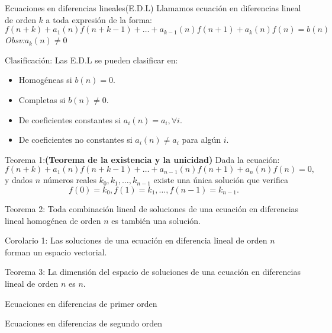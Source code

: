 \documentclass[spanish, utf8,handout]{beamer} %
\theoremstyle{definition}
\begin{document}
\begin{frame}
	 \begin{block}{Ecuaciones en diferencias lineales(E.D.L)}
	 Llamamos ecuación en diferencias lineal de orden $ k $ a toda expresión de la forma:
	 $$
	 f(n+k)+a_{1}(n)f(n+k-1)+\ldots+a_{k-1}(n)f(n+1)+a_{k}(n)f(n)=b(n)
	 $$
	 \emph{Obsv:}\hspace{2mm}$ a_{k}(n)\neq0$
	 \end{block}
 \begin{block}{Clasificación:}
 	Las E.D.L se pueden clasificar en:\\
 	\begin{itemize}
 		\item Homogéneas si $ b(n)=0 .$
 		\item Completas si $ b(n)\neq0.$
 		\item De coeficientes constantes si $ a_{i}(n)=a_{i}, \forall i .$
 		\item De coeficientes no constantes si $ a_{i}(n)\neq a_{i} $ para algún $ i .$
 	\end{itemize}
 \end{block}
\end{frame}
\begin{frame}
	\begin{block}{Teorema 1:{\bf (Teorema de la existencia y la unicidad)}}
		Dada la ecuación:
		$$
		f(n+k)+a_{1}(n)f(n+k-1)+\ldots+a_{n-1}(n)f(n+1)+a_{n}(n)f(n)=0,
		$$
		y dados $ n $ números reales $ k_{0},k_{1},\ldots,k_{n-1} $ existe una única solución que verifica 
		$$
		f(0)=k_{0},f(1)=k_{1},\ldots,f(n-1)=k_{n-1}.
		$$
	\end{block}
\begin{block}{Teorema 2:}
	Toda combinación lineal de soluciones de una ecuación en diferencias lineal homogénea de orden $ n $ es también una solución.
\end{block}
\begin{block}{Corolario 1:}
	Las soluciones de una ecuación en diferencia lineal de orden $ n $ forman un espacio vectorial.
\end{block}
\begin{block}{Teorema 3:}
	La dimensión del espacio de soluciones de una ecuación en diferencias lineal de orden $ n $ es $ n .$
\end{block}
\end{frame}




\begin{frame}
	\begin{block}{Ecuaciones en diferencias de primer orden}
		
	\end{block}
	\begin{block}{Ecuaciones en diferencias de segundo orden}
		
	\end{block}
\end{frame}
\end{document}
